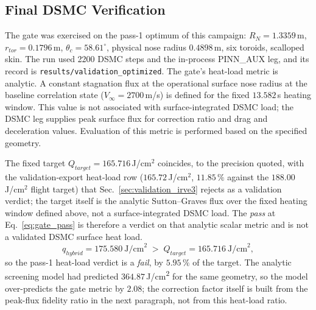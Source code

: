 \subsection{Final DSMC Verification}
The gate was exercised on the pass-1 optimum of this campaign: $R_N = 1.3359$\,m, $r_{tor} = 0.1796$\,m, $\theta_c = 58.61^\circ$, physical nose radius $0.4898$\,m, six toroids, scalloped skin. The run used 2200 DSMC steps and the in-process PINN\_AUX leg, and its record is
\texttt{results/validation\_optimized}. The gate's heat-load metric is analytic.
A constant stagnation flux at the operational surface nose radius at the baseline correlation state ($V_\infty = 2700$\,m/s) is defined for the fixed $13.582$\,s heating window. This value is not associated with surface-integrated DSMC load; the DSMC leg supplies peak surface flux for correction ratio and drag and deceleration values. Evaluation of this metric is performed based on the specified geometry.

The fixed target $Q_{target}=165.716$\,J/cm$^2$ coincides, to the precision quoted, with the validation-export heat-load row ($165.72$\,J/cm$^2$, $11.85\,\%$ against the $188.00$\,J/cm$^2$ flight target) that Sec.~\ref{sec:validation_irve3} rejects as a validation verdict; the target itself is the analytic Sutton--Graves flux over the fixed heating window defined above, not a surface-integrated DSMC load. The \emph{pass} at Eq.~\eqref{eq:gate_pass} is therefore a verdict on that analytic scalar metric and is not a validated DSMC surface heat load.
\begin{equation}
    q_{hybrid} = 175.580\ \text{J/cm}^2 \;>\; Q_{target} = 165.716\ \text{J/cm}^2,
    \label{eq:gate_fail}
\end{equation}
so the pass-1 heat-load verdict is a \emph{fail}, by $5.95\,\%$ of the target. The analytic
screening model had predicted $364.87$\,J/cm\textsuperscript{2} for the same geometry, so the model over-predicts the gate metric by $2.08$; the correction factor itself is built from the peak-flux fidelity ratio in the next paragraph, not from this heat-load ratio.


